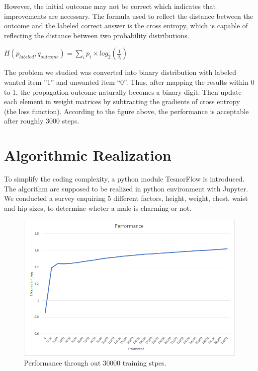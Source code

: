 \documentclass{article}
\begin{document}
\begin{spacing}{2}
    \noindent However, the initial outcome may not be correct which indicates that improvements are necessary. The formula used to reflect the distance between the outcome and the labeled correct answer is the cross entropy, which is capable of reflecting the distance between two probability distributions. 

    \begin{center}
    $H(p_{labeled},q_{outcome})=$$\sum_{i}p_i{\times}log_2(\frac{1}{q_i})$\\
    \end{center}

    \noindent The problem we studied was converted into binary distribution with labeled wanted item ”1” and unwanted item “0”. Thus, after mapping the results within 0 to 1, the propagation outcome naturally becomes a binary digit. Then update each element in weight matrices by subtracting the gradients of cross entropy (the loss function). According to the figure above, the performance is acceptable after roughly 3000 steps.
    
    \section{Algorithmic Realization}

    To simplify the coding complexity, a python module TesnorFlow\cite{TensorFlow} is introduced. The algorithm are supposed to be realized in python environment with Jupyter\cite{Jupyter}. We conducted a survey enquiring 5 different factors, height, weight, chest, waist and hip sizes, to determine wheter a male is charming or not.\\

    \begin{figure}[H]
        \centering 
        \includegraphics[width=1\textwidth]{Performance}
        \caption{Performance through out 30000 training stpes.}
        \end{figure}
  

\end{spacing}
\end{document}
